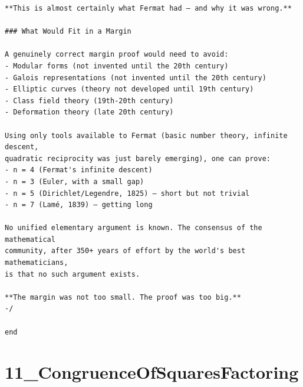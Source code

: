 \documentclass[11pt,openany]{book}
\theoremstyle{definition}
\theoremstyle{plain}
\theoremstyle{remark}
\begin{document}
\begin{lstlisting}[style=lean]
**This is almost certainly what Fermat had — and why it was wrong.**

### What Would Fit in a Margin

A genuinely correct margin proof would need to avoid:
- Modular forms (not invented until the 20th century)
- Galois representations (not invented until the 20th century)
- Elliptic curves (theory not developed until 19th century)
- Class field theory (19th-20th century)
- Deformation theory (late 20th century)

Using only tools available to Fermat (basic number theory, infinite descent,
quadratic reciprocity was just barely emerging), one can prove:
- n = 4 (Fermat's infinite descent) 
- n = 3 (Euler, with a small gap) 
- n = 5 (Dirichlet/Legendre, 1825) — short but not trivial
- n = 7 (Lamé, 1839) — getting long

No unified elementary argument is known. The consensus of the mathematical
community, after 350+ years of effort by the world's best mathematicians,
is that no such argument exists.

**The margin was not too small. The proof was too big.**
-/

end
\end{lstlisting}

\clearpage

\section*{11\_CongruenceOfSquaresFactoring}
\end{document}
